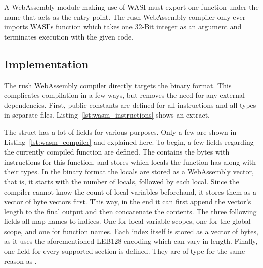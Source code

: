 A WebAssembly module making use of WASI must export one function under the name  that acts as the entry point.
The rush WebAssembly compiler only ever imports WASI's  function which takes one 32-Bit integer as an argument and terminates execution with the given code.


\subsection{Implementation}


The rush WebAssembly compiler directly targets the binary format.
This complicates compilation in a few ways, but removes the need for any external dependencies.
First, public constants are defined for all instructions and all types in separate files.
Listing~\ref{lst:wasm_instructions} shows an extract.

The  struct has a lot of fields for various purposes.
Only a few are shown in Listing~\ref{lst:wasm_compiler} and explained here.
To begin, a few fields regarding the currently compiled function are defined.
The  contains the bytes with instructions for this function, and  stores which locals the function has along with their types.
In the binary format the locals are stored as a WebAssembly vector, that is, it starts with the number of locals, followed by each local.
Since the compiler cannot know the count of local variables beforehand, it stores them as a vector of byte vectors first.
This way, in the end it can first append the vector's length to the final output and then concatenate the contents.
The three following fields all map names to indices.
One for local variable scopes, one for the global scope, and one for function names.
Each index itself is stored as a vector of bytes, as it uses the aforementioned LEB128 encoding which can vary in length.
Finally, one field for every supported section is defined.
They are of type  for the same reason as .


